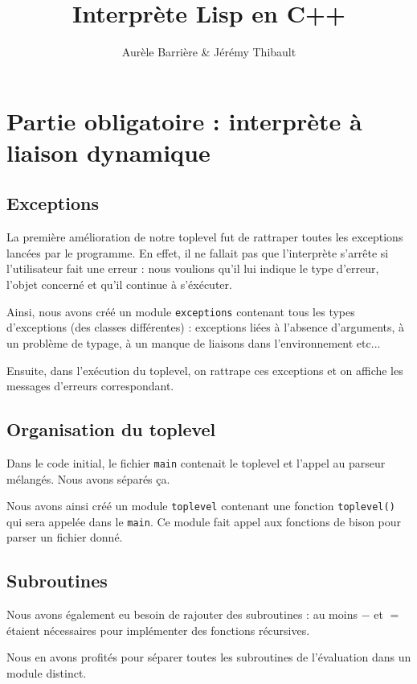 \documentclass[12pt]{article}
\title{Interprète Lisp en C++}
\author{Aurèle Barrière \& Jérémy Thibault}
\begin{document}
\maketitle
\tableofcontents
\newpage

\section{Partie obligatoire : interprète à liaison dynamique}

\subsection{Exceptions}
La première amélioration de notre toplevel fut de rattraper toutes les exceptions lancées par le programme. En effet, il ne fallait pas que l'interprète s'arrête si l'utilisateur fait une erreur : nous voulions qu'il lui indique le type d'erreur, l'objet concerné et qu'il continue à s'éxécuter.

Ainsi, nous avons créé un module \texttt{exceptions} contenant tous les types d'exceptions (des classes différentes) : exceptions liées à l'absence d'arguments, à un problème de typage, à un manque de liaisons dans l'environnement etc...

Ensuite, dans l'exécution du toplevel, on rattrape ces exceptions et on affiche les messages d'erreurs correspondant.

\subsection{Organisation du toplevel}

Dans le code initial, le fichier \texttt{main} contenait le toplevel et l'appel au parseur mélangés. Nous avons séparés ça.

Nous avons ainsi créé un module \texttt{toplevel} contenant une fonction \texttt{toplevel()} qui sera appelée dans le \texttt{main}. Ce module fait appel aux fonctions de bison pour parser un fichier donné.

\subsection{Subroutines}

Nous avons également eu besoin de rajouter des subroutines : au moins $-$ et $=$ étaient nécessaires pour implémenter des fonctions récursives.

Nous en avons profités pour séparer toutes les subroutines de l'évaluation dans un module distinct.
\end{document}
